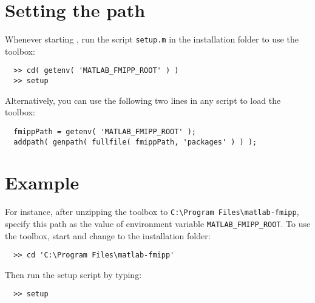 \section{Setting the \matlab path}

Whenever starting \matlab, run the script \texttt{setup.m} in the installation folder to use the \fmipp \matlab toolbox:
\begin{verbatim}
  >> cd( getenv( 'MATLAB_FMIPP_ROOT' ) )
  >> setup
\end{verbatim}
Alternatively, you can use the following two lines in any \matlab script to load the toolbox:
\begin{verbatim}
  fmippPath = getenv( 'MATLAB_FMIPP_ROOT' );
  addpath( genpath( fullfile( fmippPath, 'packages' ) ) );
\end{verbatim}


\section{Example}

For instance, after unzipping the toolbox to \texttt{C:{\textbackslash}Program~Files{\textbackslash}matlab-fmipp}, specify this path as the value of environment variable \texttt{MATLAB\_FMIPP\_ROOT}.
To use the toolbox, start \matlab and change to the installation folder:
\begin{verbatim}
  >> cd 'C:\Program Files\matlab-fmipp'
\end{verbatim}
Then run the setup script by typing:
\begin{verbatim}
  >> setup
\end{verbatim}
